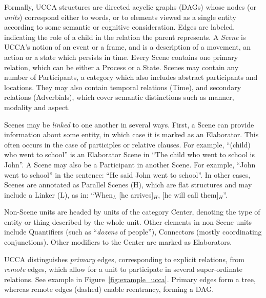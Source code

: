 \documentclass[11pt,a4paper]{article}
\begin{document}
  Formally, UCCA structures are directed acyclic graphs (DAGs) whose nodes (or {\it units}) correspond either to words,
  or to elements viewed as a single entity according to some semantic or cognitive consideration.
  Edges are labeled, indicating the role of a child in the relation the parent represents.
  A {\it Scene} is UCCA's notion of an event or a frame, and is a description of a movement, an action or a state which persists in time. 
  Every Scene contains one primary relation, which can be either a Process or a State. 
  Scenes may contain any number of Participants, a category which also includes abstract participants and locations.
  They may also contain temporal relations (Time), and secondary relations (Adverbials), 
  which cover semantic distinctions such as manner, modality and aspect.

  Scenes may be \textit{linked} to one another in several ways.
  First, a Scene can provide information about some entity,
  in which case it is marked as an Elaborator.
  This often occurs in the case of participles or relative clauses.
  For example, ``(child) who went to school'' is an Elaborator Scene
  in ``The child who went to school is John''.
  A Scene may also be a Participant in another Scene. For example, ``John went to school'' in the sentence: ``He said John went to school''. 
  In other cases, Scenes are annotated as Parallel Scenes (H), which are flat structures and may include a Linker (L), 
  as in: ``When$_L$ [he arrives]$_H$, [he will call them]$_H$''.

  Non-Scene units are headed by units of the category Center,
  denoting the type of entity or thing described by the whole unit.
  Other elements in non-Scene units include Quantifiers (such as ``{\it dozens} of people''), Connectors (mostly
  coordinating conjunctions).
  Other modifiers to the Center are marked as Elaborators.
  
  
  UCCA distinguishes \textit{primary} edges, corresponding 
  to explicit relations, from \textit{remote} edges,
  which allow for a unit to participate
  in several super-ordinate relations.
  See example in Figure~\ref{fig:example_ucca}.
  Primary edges form a tree, whereas remote edges (dashed) enable reentrancy, forming a DAG.
\end{document}

